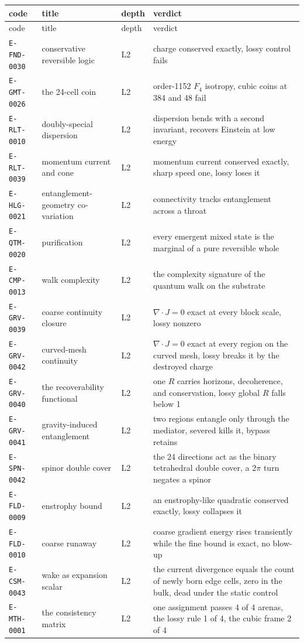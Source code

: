 \begin{longtable}{@{}>{\raggedright\arraybackslash}p{}>{\raggedright\arraybackslash}p{}>{\raggedright\arraybackslash}p{}>{\raggedright\arraybackslash}p{}@{}}
\toprule
code & title & depth & verdict \\
\midrule
\endfirsthead
\toprule
code & title & depth & verdict \\
\midrule
\endhead
\bottomrule
\endfoot
\texttt{E-FND-0030} & conservative reversible logic & L2 & charge conserved exactly, lossy control fails \\
\texttt{E-GMT-0026} & the 24-cell coin & L2 & order-1152 $F_4$ isotropy, cubic coins at 384 and 48 fail \\
\texttt{E-RLT-0010} & doubly-special dispersion & L2 & dispersion bends with a second invariant, recovers Einstein at low energy \\
\texttt{E-RLT-0039} & momentum current and cone & L2 & momentum current conserved exactly, sharp speed one, lossy loses it \\
\texttt{E-HLG-0021} & entanglement-geometry co-variation & L2 & connectivity tracks entanglement across a throat \\
\texttt{E-QTM-0020} & purification & L2 & every emergent mixed state is the marginal of a pure reversible whole \\
\texttt{E-CMP-0013} & walk complexity & L2 & the complexity signature of the quantum walk on the substrate \\
\texttt{E-GRV-0039} & coarse continuity closure & L2 & $\nabla\!\cdot J = 0$ exact at every block scale, lossy nonzero \\
\texttt{E-GRV-0042} & curved-mesh continuity & L2 & $\nabla\!\cdot J = 0$ exact at every region on the curved mesh, lossy breaks it by the destroyed charge \\
\texttt{E-GRV-0040} & the recoverability functional & L2 & one $R$ carries horizons, decoherence, and conservation, lossy global $R$ falls below 1 \\
\texttt{E-GRV-0041} & gravity-induced entanglement & L2 & two regions entangle only through the mediator, severed kills it, bypass retains \\
\texttt{E-SPN-0042} & spinor double cover & L2 & the 24 directions act as the binary tetrahedral double cover, a $2\pi$ turn negates a spinor \\
\texttt{E-FLD-0009} & enstrophy bound & L2 & an enstrophy-like quadratic conserved exactly, lossy collapses it \\
\texttt{E-FLD-0010} & coarse runaway & L2 & coarse gradient energy rises transiently while the fine bound is exact, no blow-up \\
\texttt{E-CSM-0043} & wake as expansion scalar & L2 & the current divergence equals the count of newly born edge cells, zero in the bulk, dead under the static control \\
\texttt{E-MTH-0001} & the consistency matrix & L2 & one assignment passes 4 of 4 arenas, the lossy rule 1 of 4, the cubic frame 2 of 4 \\
\end{longtable}

